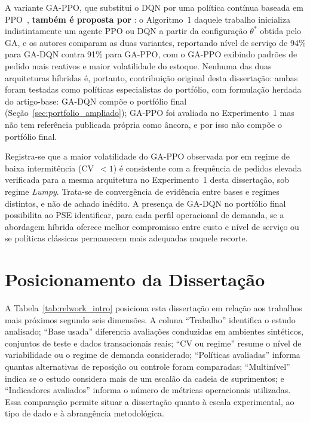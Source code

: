 A variante GA-PPO, que substitui o DQN por uma política contínua baseada em PPO~\citep{Vanvuchelen2020PPOJointReplenishment,Gijsbrechts2022DRLInventoryMSOM}, \textbf{também é proposta por} \citet{Zabraoui2025GaDQN}: o Algoritmo~1 daquele trabalho inicializa indistintamente um agente PPO ou DQN a partir da configuração $\theta^*$ obtida pelo GA, e os autores comparam as duas variantes, reportando nível de serviço de 94\% para GA-DQN contra 91\% para GA-PPO, com o GA-PPO exibindo padrões de pedido mais reativos e maior volatilidade do estoque. Nenhuma das duas arquiteturas híbridas é, portanto, contribuição original desta dissertação: ambas foram testadas como políticas especialistas do portfólio, com formulação herdada do artigo-base: GA-DQN compõe o portfólio final (Seção~\ref{sec:portfolio_ampliado}); GA-PPO foi avaliada no Experimento~1 mas não tem referência publicada própria como âncora, e por isso não compõe o portfólio final.

Registra-se que a maior volatilidade do GA-PPO observada por \citet{Zabraoui2025GaDQN} em regime de baixa intermitência (CV~$<1$) é consistente com a frequência de pedidos elevada verificada para a mesma arquitetura no Experimento~1 desta dissertação, sob regime \textit{Lumpy}. Trata-se de convergência de evidência entre bases e regimes distintos, e não de achado inédito. A presença de GA-DQN no portfólio final possibilita ao PSE identificar, para cada perfil operacional de demanda, se a abordagem híbrida oferece melhor compromisso entre custo e nível de serviço ou se políticas clássicas permanecem mais adequadas naquele recorte.

\section{Posicionamento da Dissertação}

A Tabela~\ref{tab:relwork_intro} posiciona esta dissertação em relação aos trabalhos mais próximos segundo seis dimensões. A coluna ``Trabalho'' identifica o estudo analisado; ``Base usada'' diferencia avaliações conduzidas em ambientes sintéticos, conjuntos de teste e dados transacionais reais; ``CV ou regime'' resume o nível de variabilidade ou o regime de demanda considerado; ``Políticas avaliadas'' informa quantas alternativas de reposição ou controle foram comparadas; ``Multinível'' indica se o estudo considera mais de um escalão da cadeia de suprimentos; e ``Indicadores avaliados'' informa o número de métricas operacionais utilizadas. Essa comparação permite situar a dissertação quanto à escala experimental, ao tipo de dado e à abrangência metodológica.

